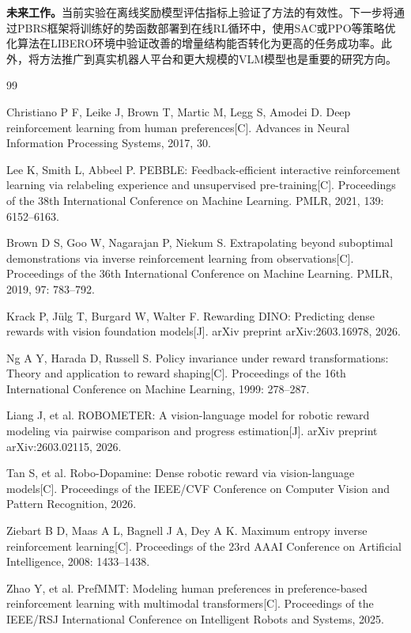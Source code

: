 \textbf{未来工作。}当前实验在离线奖励模型评估指标上验证了方法的有效性。下一步将通过PBRS框架将训练好的势函数部署到在线RL循环中，使用SAC或PPO等策略优化算法在LIBERO环境中验证改善的增量结构能否转化为更高的任务成功率。此外，将方法推广到真实机器人平台和更大规模的VLM模型也是重要的研究方向。



\clearpage
\begin{thebibliography}{99}

Christiano P F, Leike J, Brown T, Martic M, Legg S, Amodei D.
Deep reinforcement learning from human preferences[C].
Advances in Neural Information Processing Systems, 2017, 30.

Lee K, Smith L, Abbeel P.
PEBBLE: Feedback-efficient interactive reinforcement learning via relabeling experience and unsupervised pre-training[C].
Proceedings of the 38th International Conference on Machine Learning. PMLR, 2021, 139: 6152--6163.

Brown D S, Goo W, Nagarajan P, Niekum S.
Extrapolating beyond suboptimal demonstrations via inverse reinforcement learning from observations[C].
Proceedings of the 36th International Conference on Machine Learning. PMLR, 2019, 97: 783--792.

Krack P, Jülg T, Burgard W, Walter F.
Rewarding DINO: Predicting dense rewards with vision foundation models[J].
arXiv preprint arXiv:2603.16978, 2026.

Ng A Y, Harada D, Russell S.
Policy invariance under reward transformations: Theory and application to reward shaping[C].
Proceedings of the 16th International Conference on Machine Learning, 1999: 278--287.

Liang J, et al.
ROBOMETER: A vision-language model for robotic reward modeling via pairwise comparison and progress estimation[J].
arXiv preprint arXiv:2603.02115, 2026.

Tan S, et al.
Robo-Dopamine: Dense robotic reward via vision-language models[C].
Proceedings of the IEEE/CVF Conference on Computer Vision and Pattern Recognition, 2026.

Ziebart B D, Maas A L, Bagnell J A, Dey A K.
Maximum entropy inverse reinforcement learning[C].
Proceedings of the 23rd AAAI Conference on Artificial Intelligence, 2008: 1433--1438.

Zhao Y, et al.
PrefMMT: Modeling human preferences in preference-based reinforcement learning with multimodal transformers[C].
Proceedings of the IEEE/RSJ International Conference on Intelligent Robots and Systems, 2025.


\end{thebibliography}
